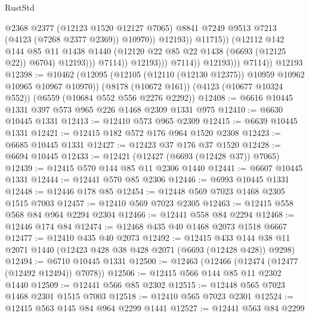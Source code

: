 \begin{lexlean}{RustStd}
\begin{coremodule}
                                            @2368
                                            @2377
                                            (@12123 @1520 @12127 @7065)
                                            @8841
                                            @7249
                                            @9513
                                            @7213
                                            (@4123 (@7268 @2377 @2369))
                                            @10970))
                                        @12193))
                                    @11715))
                                (@12112
                                  @142
                                  @144
                                  @85
                                  @11
                                  @1438
                                  @1440
                                  (@12120 @22 @85 @22 @1438 (@6693 (@12125 @22)) @6704)
                                  @12193)))
                            @7114))
                        @12193)))
                  @7114))
              @12193)))
        @7114))
    @12193
@12398 := @10462
    (@12095 (@12105 (@12110 (@12130 @12375)) @10959 @10962 @10965 @10967 @10970))
    (@8178 (@10672 @161))
    (@4123 (@10677 @10324 @552))
    (@6559 (@10684 @552 @556 @2276 @2292))
@12408 := @6616 @10445 @1331 @397 @573 @965 @226 @1468 @2309 @1331 @975
@12410 := @6630 @10445 @1331
@12413 := @12410 @573 @965 @2309
@12415 := @6639 @10445 @1331
@12421 := @12415 @182 @572 @176 @964 @1520 @2308
@12423 := @6685 @10445 @1331
@12427 := @12423 @37 @176 @37 @1520
@12428 := @6694 @10445
@12433 := @12421 (@12427 (@6693 (@12428 @37)) @7065)
@12439 := @12415 @570 @144 @85 @11 @2306 @1440
@12441 := @6607 @10445 @1331
@12444 := @12441 @570 @85 @2306
@12446 := @6993 @10445 @1331
@12448 := @12446 @178 @85
@12454 := @12448 @569 @7023 @1468 @2305 @1515 @7003
@12457 := @12410 @569 @7023 @2305
@12463 := @12415 @558 @568 @84 @964 @2294 @2304
@12466 := @12441 @558 @84 @2294
@12468 := @12446 @174 @84
@12474 := @12468 @435 @40 @1468 @2073 @1518 @6667
@12477 := @12410 @435 @40 @2073
@12492 := @12415
    @433
    @144
    @38
    @11
    @2071
    @1440
    (@12423 @428 @38 @428 @2071 (@6693 (@12428 @428)) @9298)
@12494 := @6710 @10445 @1331
@12500 := @12463 (@12466 (@12474 (@12477 (@12492 @12494)) @7078))
@12506 := @12415 @566 @144 @85 @11 @2302 @1440
@12509 := @12441 @566 @85 @2302
@12515 := @12448 @565 @7023 @1468 @2301 @1515 @7003
@12518 := @12410 @565 @7023 @2301
@12524 := @12415 @563 @145 @84 @964 @2299 @1441
@12527 := @12441 @563 @84 @2299

\end{coremodule}
\end{lexlean}
